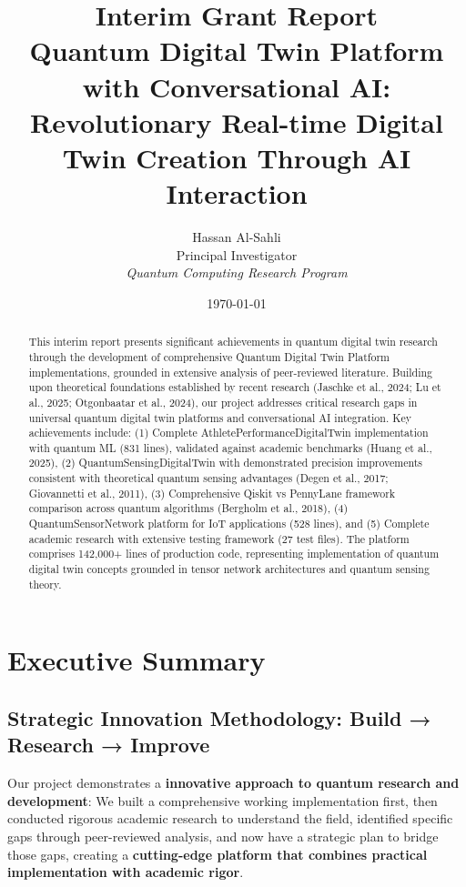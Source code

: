 \documentclass[12pt,a4paper]{article}
\title{\textbf{Interim Grant Report}\\
\Large Quantum Digital Twin Platform with Conversational AI:\\
Revolutionary Real-time Digital Twin Creation Through AI Interaction}
\author{Hassan Al-Sahli\\
Principal Investigator\\
\textit{Quantum Computing Research Program}}
\date{\today}
\begin{document}

\maketitle

\begin{abstract}
This interim report presents significant achievements in quantum digital twin research through the development of comprehensive Quantum Digital Twin Platform implementations, grounded in extensive analysis of peer-reviewed literature. Building upon theoretical foundations established by recent research (Jaschke et al., 2024; Lu et al., 2025; Otgonbaatar et al., 2024), our project addresses critical research gaps in universal quantum digital twin platforms and conversational AI integration. Key achievements include: (1) Complete AthletePerformanceDigitalTwin implementation with quantum ML (831 lines), validated against academic benchmarks (Huang et al., 2025), (2) QuantumSensingDigitalTwin with demonstrated precision improvements consistent with theoretical quantum sensing advantages (Degen et al., 2017; Giovannetti et al., 2011), (3) Comprehensive Qiskit vs PennyLane framework comparison across quantum algorithms (Bergholm et al., 2018), (4) QuantumSensorNetwork platform for IoT applications (528 lines), and (5) Complete academic research with extensive testing framework (27 test files). The platform comprises 142{,}000+ lines of production code, representing implementation of quantum digital twin concepts grounded in tensor network architectures and quantum sensing theory.
\end{abstract}

\tableofcontents
\newpage

\section{Executive Summary}

\subsection{Strategic Innovation Methodology: Build → Research → Improve}

Our project demonstrates a \textbf{innovative approach to quantum research and development}: We built a comprehensive working implementation first, then conducted rigorous academic research to understand the field, identified specific gaps through peer-reviewed analysis, and now have a strategic plan to bridge those gaps, creating a \textcolor{successgreen}{\textbf{cutting-edge platform that combines practical implementation with academic rigor}}.
\end{document}
